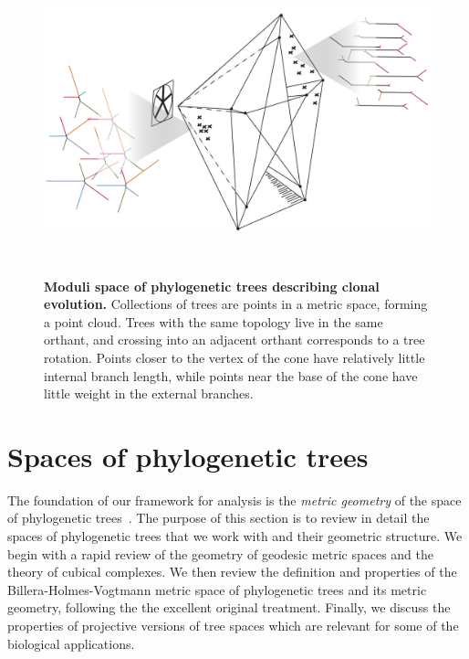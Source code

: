 \documentclass[a4paper,11pt]{article}
\begin{document}
\begin{figure}
    \centering
    \includegraphics[height=3.5in]{../figures/illustration_BHV_5.png}
    \caption{{\bf Moduli space of phylogenetic trees describing clonal evolution.} Collections of trees are points in a metric space, forming a point cloud. Trees with the same topology live in the same orthant, and crossing into an adjacent orthant corresponds to a tree rotation. Points closer to the vertex of the cone have relatively little internal branch length, while points near the base of the cone have little weight in the external branches.}
    \label{fig:illustration_2}
\end{figure}



\section{Spaces of phylogenetic trees}\label{sec:phylospace}

The foundation of our framework for analysis is the {\em metric geometry} of the space of phylogenetic trees~\cite{billera2001geometry}.
The purpose of this section is to review in detail the spaces of phylogenetic trees that we work with and their geometric structure.
We begin with a rapid review of the geometry of geodesic metric spaces and the theory of cubical complexes.
We then review the definition and properties of the Billera-Holmes-Vogtmann metric space of phylogenetic trees and its metric geometry, following the the excellent original treatment.
Finally, we discuss the properties of projective versions of tree spaces which are relevant for some of the biological applications.
\end{document}
